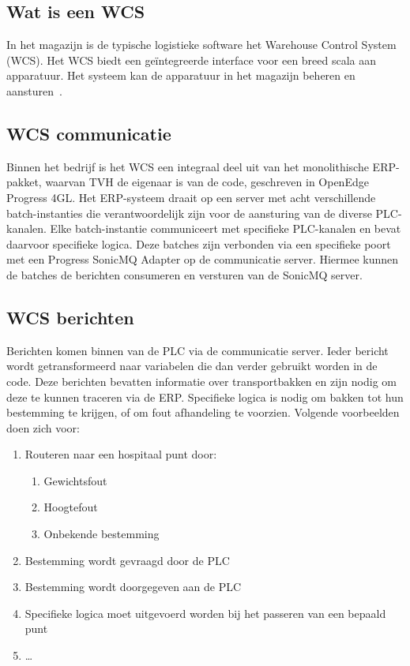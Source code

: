 \subsection{Wat is een WCS}
In het magazijn is de typische logistieke software het Warehouse Control System (WCS). 
Het WCS biedt een geïntegreerde interface voor een breed scala aan apparatuur. 
Het systeem kan de apparatuur in het magazijn beheren en aansturen~\autocite{Son2015}. 
 
\subsection{WCS communicatie} 
Binnen het bedrijf is het WCS een integraal deel uit van het monolithische ERP-pakket, waarvan TVH de eigenaar is van de code, geschreven in OpenEdge Progress 4GL. 
Het ERP-systeem draait op een server met acht verschillende batch-instanties die verantwoordelijk zijn voor de aansturing van de diverse PLC-kanalen. 
Elke batch-instantie communiceert met specifieke PLC-kanalen en bevat daarvoor specifieke logica.
Deze batches zijn verbonden via een specifieke poort met een Progress SonicMQ Adapter op de communicatie server.
Hiermee kunnen de batches de berichten consumeren en versturen van de SonicMQ server.

\subsection{WCS berichten} 
Berichten komen binnen van de PLC via de communicatie server. Ieder bericht wordt getransformeerd naar variabelen die dan verder gebruikt worden in de code.
Deze berichten bevatten informatie over transportbakken en zijn nodig om deze te kunnen traceren via de ERP.
Specifieke logica is nodig om bakken tot hun bestemming te krijgen, of om fout afhandeling te voorzien.
Volgende voorbeelden doen zich voor:
\begin{enumerate}
  \item Routeren naar een hospitaal punt door: 
  \begin{enumerate}
    \item Gewichtsfout
    \item Hoogtefout
    \item Onbekende bestemming
  \end{enumerate}
  \item Bestemming wordt gevraagd door de PLC
  \item Bestemming wordt doorgegeven aan de PLC 
  \item Specifieke logica moet uitgevoerd worden bij het passeren van een bepaald punt
  \item \dots
\end{enumerate}

